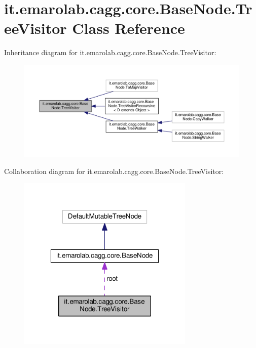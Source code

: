 \hypertarget{classit_1_1emarolab_1_1cagg_1_1core_1_1BaseNode_1_1TreeVisitor}{\section{it.\-emarolab.\-cagg.\-core.\-Base\-Node.\-Tree\-Visitor Class Reference}
\label{classit_1_1emarolab_1_1cagg_1_1core_1_1BaseNode_1_1TreeVisitor}
}


Inheritance diagram for it.\-emarolab.\-cagg.\-core.\-Base\-Node.\-Tree\-Visitor\-:\nopagebreak
\begin{figure}[H]
\begin{center}
\leavevmode
\includegraphics[width=350pt]{classit_1_1emarolab_1_1cagg_1_1core_1_1BaseNode_1_1TreeVisitor__inherit__graph}
\end{center}
\end{figure}


Collaboration diagram for it.\-emarolab.\-cagg.\-core.\-Base\-Node.\-Tree\-Visitor\-:\nopagebreak
\begin{figure}[H]
\begin{center}
\leavevmode
\includegraphics[width=238pt]{classit_1_1emarolab_1_1cagg_1_1core_1_1BaseNode_1_1TreeVisitor__coll__graph}
\end{center}
\end{figure}
